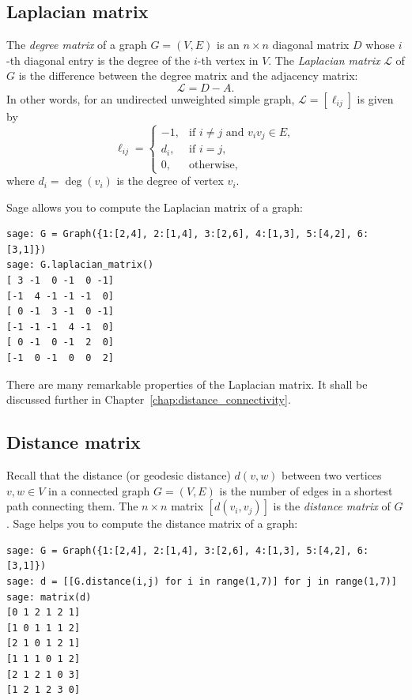 
\subsection{Laplacian matrix}

The \emph{degree matrix} of a graph $G = (V,E)$ is an $n \times n$
diagonal matrix $D$ whose $i$-th diagonal entry is the degree of the
$i$-th vertex in $V$. The \emph{Laplacian matrix} $\mathcal{L}$ of $G$
is the difference between the degree matrix and the adjacency matrix:
\[
\mathcal{L} = D - A.
\]
In other words, for an undirected unweighted simple graph,
$\mathcal{L} = [\ell_{ij}]$ is given by
\[
\ell_{ij}
=
\begin{cases}
-1,  & \text{if $i \neq j$ and $v_i v_j \in E$}, \\
d_i, & \text{if $i = j$}, \\
0,   & \text{otherwise},
\end{cases}
\]
where $d_i = \deg(v_i)$ is the degree of vertex $v_i$.

Sage allows you to compute the Laplacian matrix of a graph:
%
\begin{lstlisting}
sage: G = Graph({1:[2,4], 2:[1,4], 3:[2,6], 4:[1,3], 5:[4,2], 6:[3,1]})
sage: G.laplacian_matrix()
[ 3 -1  0 -1  0 -1]
[-1  4 -1 -1 -1  0]
[ 0 -1  3 -1  0 -1]
[-1 -1 -1  4 -1  0]
[ 0 -1  0 -1  2  0]
[-1  0 -1  0  0  2]
\end{lstlisting}
%
There are many remarkable properties of the Laplacian matrix. It shall
be discussed further in Chapter~\ref{chap:distance_connectivity}.



\subsection{Distance matrix}

Recall that the distance (or geodesic distance) $d(v,w)$ between two
vertices $v,w \in V$ in a connected graph $G = (V,E)$ is the number of
edges in a shortest path connecting them. The $n \times n$ matrix
$[d(v_i, v_j)]$ is the \emph{distance matrix} of $G$. Sage helps you
to compute the distance matrix of a graph:
%
\begin{lstlisting}
sage: G = Graph({1:[2,4], 2:[1,4], 3:[2,6], 4:[1,3], 5:[4,2], 6:[3,1]})
sage: d = [[G.distance(i,j) for i in range(1,7)] for j in range(1,7)]
sage: matrix(d)
[0 1 2 1 2 1]
[1 0 1 1 1 2]
[2 1 0 1 2 1]
[1 1 1 0 1 2]
[2 1 2 1 0 3]
[1 2 1 2 3 0]
\end{lstlisting}

